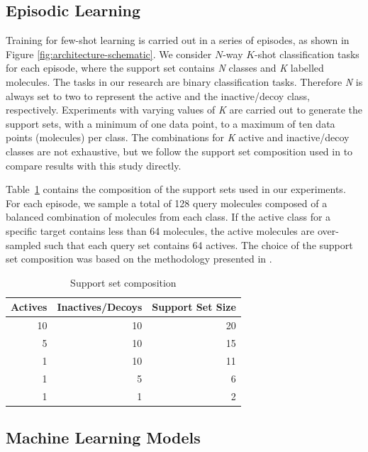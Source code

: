 \subsection{Episodic Learning}

Training for few-shot learning is carried out in a series of episodes, as shown in Figure \ref{fig:architecture-schematic}. We consider $N$-way $K$-shot classification tasks for each episode, where the support set contains \textit{N} classes and \textit{K} labelled molecules. The tasks in our research are binary classification tasks. Therefore \textit{N} is always set to two to represent the active and the inactive/decoy class, respectively. Experiments with varying values of \textit{K} are carried out to generate the support sets, with a minimum of one data point, to a maximum of ten data points (molecules) per class. The combinations for \textit{K} active and inactive/decoy classes are not exhaustive, but we follow the support set composition used in \citet{altae2017low} to compare results with this study directly.

Table~\ref{table:support-set-sizes} contains the composition of the support sets used in our experiments. For each episode, we sample a total of 128 query molecules composed of a balanced combination of molecules from each class. If the active class for a specific target contains less than 64 molecules, the active molecules are over-sampled such that each query set contains 64 actives. The choice of the support set composition was based on the methodology presented in \citet{altae2017low}.

\begin{table}
    \centering
    \begin{tabular}{@{}rrr@{}}
        \hline
        Actives & Inactives/Decoys & Support Set Size \\
        \hline
        10  & 10 & 20 \\
        5   & 10 & 15 \\
        1   & 10 & 11 \\
        1   & 5  & 6 \\
        1   & 1  & 2 \\
        \hline
    \end{tabular}
    \caption{Support set composition}
    \label{table:support-set-sizes}
\end{table}

\subsection{Machine Learning Models}

